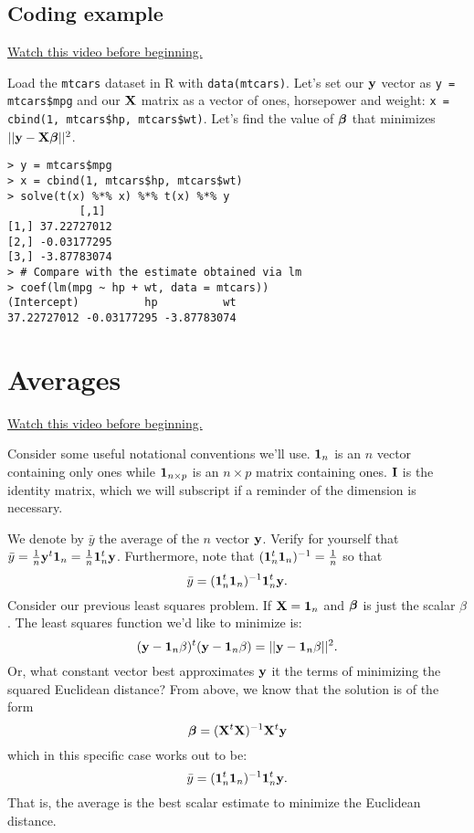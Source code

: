 \subsection{Coding example}

\href{https://www.youtube.com/watch?v=wW-4P7pl6E0&index=2&list=PLpl-gQkQivXhdgUCdaUQcdb31CRe8Mm2y}{Watch this video before beginning.}

Load the \texttt{mtcars} dataset in R with \texttt{data(mtcars)}.
Let's set our $\mathbf{y}$ vector as \texttt{y = mtcars\$mpg} and our
$\mathbf{X}$ matrix as a vector of ones, horsepower and weight:
\texttt{x = cbind(1, mtcars\$hp, mtcars\$wt)}. Let's find the
value of $\boldsymbol{\beta}$ that minimizes $|| \mathbf{y} - \mathbf{X} \boldsymbol{\beta}||^2$. 

\begin{verbatim}
> y = mtcars$mpg
> x = cbind(1, mtcars$hp, mtcars$wt)
> solve(t(x) %*% x) %*% t(x) %*% y
           [,1]
[1,] 37.22727012
[2,] -0.03177295
[3,] -3.87783074
> # Compare with the estimate obtained via lm
> coef(lm(mpg ~ hp + wt, data = mtcars))
(Intercept)          hp          wt 
37.22727012 -0.03177295 -3.87783074 
\end{verbatim}



\section{Averages}

\href{https://www.youtube.com/watch?v=GbcBLDS1VBw&index=3&list=PLpl-gQkQivXhdgUCdaUQcdb31CRe8Mm2y}{Watch this video before beginning.}

Consider some useful notational conventions we'll use. 
$\mathbf{1}_n$ is an  $n$ vector containing only ones while
$\mathbf{1}_{n\times p}$ is an $n\times p$ matrix containing ones.
$\mathbf{I}$ is the identity matrix, which we will subscript if a
reminder of the dimension is necessary.

We denote by $\bar y$ the average of the $n$ vector $\mathbf{y}$.
Verify for yourself that $\bar y = \frac{1}{n} \mathbf{y}^t \mathbf{1}_n = \frac{1}{n} \mathbf{1}_n^t \mathbf{y}$.
Furthermore, note that $(\mathbf{1}_n^t \mathbf{1}_n)^{-1} = \frac{1}{n}$ so that
$$
\bar y = (\mathbf{1}_n^t \mathbf{1}_n)^{-1} \mathbf{1}^t_n \mathbf{y}.
$$
Consider our previous least squares problem. If $\mathbf{X} = \mathbf{1}_n$ and $\boldsymbol{\beta}$ 
is just the scalar $\beta$. The least squares function we'd like to minimize
is:
$$
(\mathbf{y} - \mathbf{1}_n  \beta)^t (\mathbf{y} -  \mathbf{1}_n \beta) = ||\mathbf{y} -  \mathbf{1}_n\beta||^2.
$$
Or, what constant vector best approximates $\mathbf{y}$ it the terms of minimizing the
squared Euclidean distance? From above, we know that the solution is of the form 
$$
\boldsymbol{\beta} = (\mathbf{X}^t \mathbf{X})^{-1} \mathbf{X}^t \mathbf{y}
$$
which in this specific case works out to be:
$$
\bar y = (\mathbf{1}_n^t \mathbf{1}_n)^{-1} \mathbf{1}^t_n \mathbf{y}.
$$
That is, the average is the best scalar estimate to minimize the 
Euclidean distance. 

